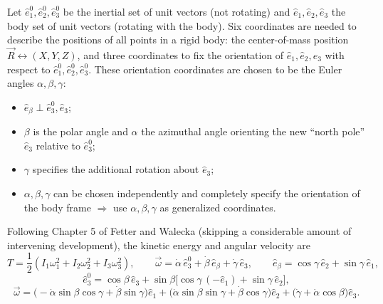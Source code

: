 \documentclass[11pt]{article}
\newcommand{\ebeta}{\hat e_{\beta}}
\begin{document}
Let $\hat e_1^0,\hat e_2^0,\hat e_3^0$ be the inertial set of unit vectors (not rotating) and $\hat e_1,\hat e_2,\hat e_3$ the body set of unit vectors (rotating with the body). Six coordinates are needed to describe the positions of all points in a rigid body: the center-of-mass position $\vec R\leftrightarrow(X,Y,Z)$, and three coordinates to fix the orientation of $\hat e_1,\hat e_2,\hat e_3$ with respect to $\hat e_1^0,\hat e_2^0,\hat e_3^0$. These orientation coordinates are chosen to be the Euler angles $\alpha,\beta,\gamma$:
\begin{itemize}
\item $\ebeta\perp\hat e_3^0,\hat e_3$;
\item $\beta$ is the polar angle and $\alpha$ the azimuthal angle orienting the new ``north pole'' $\hat e_3$ relative to $\hat e_3^0$;
\item $\gamma$ specifies the additional rotation about $\hat e_3$;
\item $\alpha,\beta,\gamma$ can be chosen independently and completely specify the orientation of the body frame $\Rightarrow$ use $\alpha,\beta,\gamma$ as generalized coordinates.
\end{itemize}
Following Chapter 5 of Fetter and Walecka (skipping a considerable amount of intervening development), the kinetic energy and angular velocity are
\begin{equation}
T = \frac12\left(I_1\omega_1^2+I_2\omega_2^2+I_3\omega_3^2\right), \qquad
\vec\omega = \dot\alpha\,\hat e_3^0+\dot\beta\,\ebeta+\dot\gamma\,\hat e_3, \qquad \ebeta = \cos\gamma\,\hat e_2+\sin\gamma\,\hat e_1,
\label{eq:euler-omega-def}
\end{equation}
\begin{equation}
\hat e_3^0 = \cos\beta\,\hat e_3+\sin\beta\big[\cos\gamma\,(-\hat e_1)+\sin\gamma\,\hat e_2\big],
\label{eq:e3zero-decomp}
\end{equation}
\begin{equation}
\boxed{\vec\omega = \big(-\dot\alpha\sin\beta\cos\gamma+\dot\beta\sin\gamma\big)\hat e_1 + \big(\dot\alpha\sin\beta\sin\gamma+\dot\beta\cos\gamma\big)\hat e_2 + \big(\dot\gamma+\dot\alpha\cos\beta\big)\hat e_3.}
\label{eq:omega-euler}
\end{equation}
\end{document}
